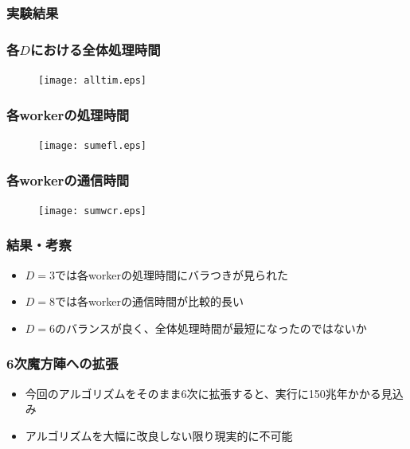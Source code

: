 \documentclass[dvipdfmx,20pt,notheorems,t]{beamer}
\begin{document}
\begin{frame}\frametitle{実験結果}
\end{frame}

\begin{frame}\frametitle{各$D$における全体処理時間}
\begin{figure}[htb]
\centering
\texttt{[image: alltim.eps]}
\end{figure}
\end{frame}

\begin{frame}\frametitle{各workerの処理時間}
\begin{figure}[htb]
\centering
\texttt{[image: sumefl.eps]}
\end{figure}
\end{frame}

\begin{frame}\frametitle{各workerの通信時間}
\begin{figure}[htb]
\centering
\texttt{[image: sumwcr.eps]}
\end{figure}
\end{frame}

\begin{frame}\frametitle{結果・考察}
\begin{itemize}
\item $D=3$では各workerの処理時間にバラつきが見られた
\item $D=8$では各workerの通信時間が比較的長い
\item $D=6$のバランスが良く、全体処理時間が最短になったのではないか
\end{itemize}
\end{frame}

\begin{frame}\frametitle{6次魔方陣への拡張}
\begin{itemize}
\item 今回のアルゴリズムをそのまま6次に拡張すると、実行に150兆年かかる見込み
\item アルゴリズムを大幅に改良しない限り現実的に不可能
\end{itemize}
\end{frame}
\end{document}
